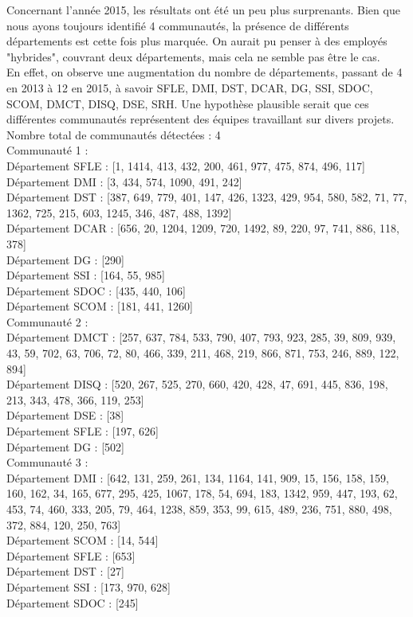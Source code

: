 \documentclass{article}
\begin{document}
Concernant l'année 2015, les résultats ont été un peu plus surprenants. Bien que nous ayons toujours identifié 4 communautés, la présence de différents départements est cette fois plus marquée. On aurait pu penser à des employés "hybrides", couvrant deux départements, mais cela ne semble pas être le cas. \\

En effet, on observe une augmentation du nombre de départements, passant de 4 en 2013 à 12 en 2015, à savoir SFLE, DMI, DST, DCAR, DG, SSI, SDOC, SCOM, DMCT, DISQ, DSE, SRH. Une hypothèse plausible serait que ces différentes communautés représentent des équipes travaillant sur divers projets. \\

\noindent
Nombre total de communautés détectées : 4 \\

\noindent
Communauté 1 : \\
Département SFLE : [1, 1414, 413, 432, 200, 461, 977, 475, 874, 496, 117] \\
Département DMI : [3, 434, 574, 1090, 491, 242] \\
Département DST : [387, 649, 779, 401, 147, 426, 1323, 429, 954, 580, 582, 71, 77, 1362, 725, 215, 603, 1245, 346, 487, 488, 1392] \\
Département DCAR : [656, 20, 1204, 1209, 720, 1492, 89, 220, 97, 741, 886, 118, 378] \\
Département DG : [290] \\
Département SSI : [164, 55, 985] \\
Département SDOC : [435, 440, 106] \\
Département SCOM : [181, 441, 1260] \\

\noindent
Communauté 2 : \\
Département DMCT : [257, 637, 784, 533, 790, 407, 793, 923, 285, 39, 809, 939, 43, 59, 702, 63, 706, 72, 80, 466, 339, 211, 468, 219, 866, 871, 753, 246, 889, 122, 894] \\
Département DISQ : [520, 267, 525, 270, 660, 420, 428, 47, 691, 445, 836, 198, 213, 343, 478, 366, 119, 253] \\
Département DSE : [38] \\
Département SFLE : [197, 626] \\
Département DG : [502] \\

\noindent
Communauté 3 : \\
Département DMI : [642, 131, 259, 261, 134, 1164, 141, 909, 15, 156, 158, 159, 160, 162, 34, 165, 677, 295, 425, 1067, 178, 54, 694, 183, 1342, 959, 447, 193, 62, 453, 74, 460, 333, 205, 79, 464, 1238, 859, 353, 99, 615, 489, 236, 751, 880, 498, 372, 884, 120, 250, 763] \\
Département SCOM : [14, 544] \\
Département SFLE : [653] \\
Département DST : [27] \\
Département SSI : [173, 970, 628] \\
Département SDOC : [245] \\
\end{document}
